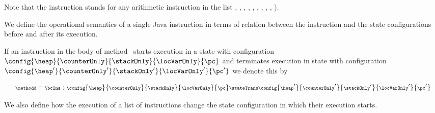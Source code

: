  Note that the instruction \arithOp stands for any arithmetic instruction in the list  , , , 
 , ,  , , , ,  ).
 


 


 We define the operational semantics of a single Java instruction in terms of
 relation between the instruction and the state configurations
 before and after its execution.

 \begin{StateTransition} \label{stateTrans} 
 If an instruction \bcIns in the body of method \methodd \ starts execution in a state with configuration  
 $\config{ \heap}{\counterOnly}{\stackOnly}{\locVarOnly}{ \pc}$ and
  terminates execution in state with configuration  $\config{ \heap'}{\counterOnly'}{\stackOnly'}{\locVarOnly'}{\pc'}$ we denote this by

  $$  {\scriptsize \methodd \vdash \bcIns : \config{ \heap}{\counterOnly}{\stackOnly}{\locVarOnly}{ \pc }   \stateTrans \config{ \heap'}{\counterOnly'}{\stackOnly'}{\locVarOnly'}{\pc'} } $$
 \end{StateTransition}

 We also define how the execution of a list of instructions change the state configuration in  which their execution starts.
 

